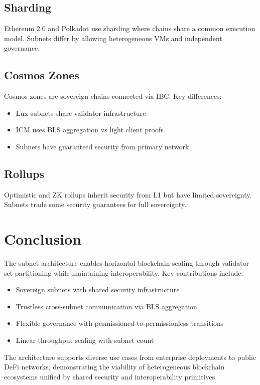 \documentclass[11pt,a4paper]{article}
\begin{document}
\subsection{Sharding}

Ethereum 2.0 and Polkadot use sharding where chains share a common execution model. Subnets differ by allowing heterogeneous VMs and independent governance.

\subsection{Cosmos Zones}

Cosmos zones are sovereign chains connected via IBC. Key differences:
\begin{itemize}
    \item Lux subnets share validator infrastructure
    \item ICM uses BLS aggregation vs light client proofs
    \item Subnets have guaranteed security from primary network
\end{itemize}

\subsection{Rollups}

Optimistic and ZK rollups inherit security from L1 but have limited sovereignty. Subnets trade some security guarantees for full sovereignty.

\section{Conclusion}

The subnet architecture enables horizontal blockchain scaling through validator set partitioning while maintaining interoperability. Key contributions include:

\begin{itemize}
    \item Sovereign subnets with shared security infrastructure
    \item Trustless cross-subnet communication via BLS aggregation
    \item Flexible governance with permissioned-to-permissionless transitions
    \item Linear throughput scaling with subnet count
\end{itemize}

The architecture supports diverse use cases from enterprise deployments to public DeFi networks, demonstrating the viability of heterogeneous blockchain ecosystems unified by shared security and interoperability primitives.
\end{document}
